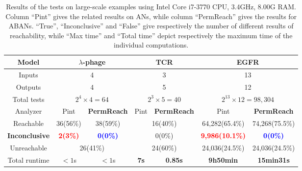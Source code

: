 \documentclass[runningheads]{llncs}
\begin{document}

\begin{table}[ht]
\centering
    \begin{tabular}{|c|c|c|c|c|c|c|}
    \hline
  	Model	&\multicolumn{2}{c|}{$\lambda$-phage}	&	  \multicolumn{2}{c|}{TCR} & \multicolumn{2}{c|}{EGFR}  \\
    \hline
    Inputs&\multicolumn{2}{c|}{4}	&	  \multicolumn{2}{c|}{3} & \multicolumn{2}{c|}{13}\\
    \hline
    Outputs&\multicolumn{2}{c|}{4} &	  \multicolumn{2}{c|}{5} & \multicolumn{2}{c|}{12} \\
    \hline
    Total tests&\multicolumn{2}{c|}{$2^4\times 4=64$} & \multicolumn{2}{c|}{$2^3\times 5=40$} & \multicolumn{2}{c|}{$2^{13}\times 12=98,304$}\\
    \hline
    Analyzer  &  Pint       &\textbf{PermReach}    &  Pint       &\textbf{PermReach}   &  Pint       &\textbf{PermReach}             \\
    \hline
    Reachable    & 36(56\%)& 38(59\%)   &  \multicolumn{2}{c|}{16(40\%)}  & 64,282(65.4\%)&74,268(75.5\%)\\
    \hline
    \textbf{Inconclusive} & \textcolor{red}{\textbf{2(3\%)}}&\textcolor{blue}{\textbf{0(0\%)}}& \multicolumn{2}{c|}{0(0\%)}    &\textcolor{red}{\textbf{9,986(10.1\%)}}&\textcolor{blue}{\textbf{0(0\%)}}  \\
    \hline
    Unreachable     &  \multicolumn{2}{c|}{26(41\%)} &  \multicolumn{2}{c|}{24(60\%)} &24,036(24.5\%)&24,036(24.5\%)\\
    \hline
    Total runtime &  $<1$s       &  $<1$s &  \textbf{7s}       &  \textbf{0.85s}        & \textbf{9h50min}              & \textbf{15min31s}      \\
    \hline
    \end{tabular}
\caption{Results of the tests on large-scale examples using Intel Core i7-3770 CPU, \@3.4GHz, 8.00G RAM. 
Column “Pint” gives the related results on ANs, while column “PermReach” gives the results for ABANs. 
“True”, “Inconclusive” and “False” give respectively the number of different results of reachability, while “Max time” and “Total time” depict respectively the maximum time of the individual computations.}
\label{tab:2}
\end{table}
\end{document}
